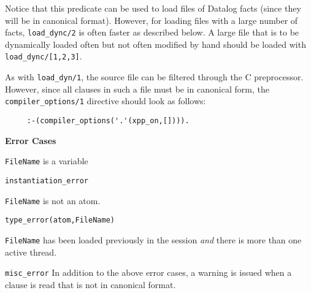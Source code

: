 \begin{description}

    Notice that this predicate can be used to load files of Datalog
    facts (since they will be in canonical format).  However, for
    loading files with a large number of facts, {\tt load\_dync/2} is
    often faster as described below.  A large file that is to be
    dynamically loaded often but not often modified by hand should be
    loaded with {\tt load\_dync/[1,2,3]}.

    As with \verb|load_dyn/1|, the source file can be filtered through the C
    preprocessor. However, since all clauses in such a file must be in
    canonical form, the \verb|compiler_options/1| directive should look as
    follows:
    \begin{verbatim}
     :-(compiler_options('.'(xpp_on,[]))).      
    \end{verbatim}

{\bf Error Cases}
\bi
\item 	{\tt FileName} is a variable
\bi
\item 	{\tt instantiation\_error}
\ei
\item 	{\tt FileName} is not an atom.
\bi
\item 	{\tt type\_error(atom,FileName)}
\ei
%
\item {\tt FileName} has been loaded previously in the session {\em and}
  there is more than one active thread.  
\bi
\item {\tt misc\_error}
\ei
\ei
%
  In addition to the above error cases, a warning is issued when a
  clause is read that is not in canonical format.


\end{description}
